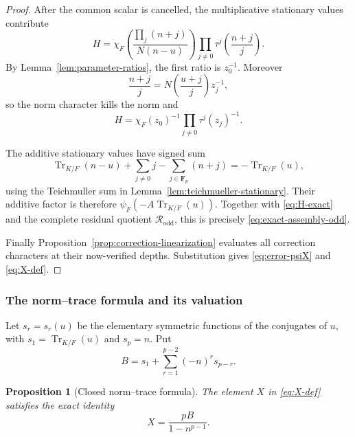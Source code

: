 \documentclass[11pt]{amsart}
\newtheorem{proposition}[theorem]{Proposition}
\theoremstyle{definition}
\theoremstyle{remark}
\newcommand{\F}{\mathbf F}
\newcommand{\Tr}{\operatorname{Tr}}
\begin{document}
\begin{proof}
After the common scalar is cancelled, the multiplicative stationary
values contribute
\begin{equation}\label{eq:H-mult}
 H=\chi_F\!\left(\frac{\prod_j(n+j)}{N(n-u)}\right)
   \prod_{j\ne0}\tau^j\!\left(\frac{n+j}{j}\right).
\end{equation}
By Lemma~\ref{lem:parameter-ratios}, the first ratio is $z_0^{-1}$.
Moreover
\[
 \frac{n+j}{j}=N\!\left(\frac{u+j}{j}\right)z_j^{-1},
\]
so the norm character kills the norm and
\begin{equation}\label{eq:H-exact}
 H=\chi_F(z_0)^{-1}\prod_{j\ne0}\tau^j(z_j)^{-1}.
\end{equation}

The additive stationary values have signed sum
\[
 \Tr_{K/F}(n-u)+\sum_{j\ne0}j-
 \sum_{j\in\F_p}(n+j)=-\Tr_{K/F}(u),
\]
using the Teichmuller sum in
Lemma~\ref{lem:teichmueller-stationary}.  Their additive factor is
therefore $\psi_F(-A\Tr_{K/F}(u))$.  Together with
\eqref{eq:H-exact} and the complete residual quotient
$\mathcal R_{\mathrm{odd}}$, this is precisely
\eqref{eq:exact-assembly-odd}.

Finally Proposition~\ref{prop:correction-linearization} evaluates all
correction characters at their now-verified depths.  Substitution gives
\eqref{eq:error-psiX} and \eqref{eq:X-def}.
\end{proof}

\subsubsection{The norm--trace formula and its valuation}

Let $s_r=s_r(u)$ be the elementary symmetric functions of the
conjugates of $u$, with $s_1=\Tr_{K/F}(u)$ and $s_p=n$.  Put
\begin{equation}\label{eq:B-def}
 B=s_1+\sum_{r=1}^{p-2}(-n)^r s_{p-r}.
\end{equation}

\begin{proposition}[Closed norm--trace formula]\label{prop:X-closed}
The element $X$ in \eqref{eq:X-def} satisfies the exact identity
\begin{equation}\label{eq:X-closed}
 X=\frac{pB}{1-n^{p-1}}.
\end{equation}
\end{proposition}
\end{document}
